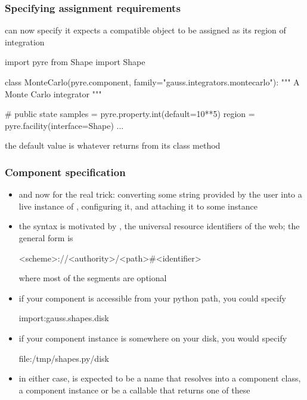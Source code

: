 \begin{frame}[fragile]
%
  \frametitle{Specifying assignment requirements}
%
   can now specify it expects a  compatible object to be
  assigned as its region of integration
%
  \begin{ipython}{}
import pyre
from Shape import Shape

class MonteCarlo(pyre.component, family="gauss.integrators.montecarlo"):
    """
    A Monte Carlo integrator
    """

    # public state
    samples = pyre.property.int(default=10**5)
    region = pyre.facility(interface=Shape)
    ...
  \end{ipython}
%
  the default value is whatever  returns from its  class
  method
%
\end{frame}

\begin{frame}[fragile]
%
  \frametitle{Component specification}
%
  \begin{itemize}
%
  \item and now for the real trick: converting some string provided by the user into a live
    instance of , configuring it, and attaching it to some
     instance
%
  \item the syntax is motivated by , the universal resource identifiers of the
    web; the general form is
    \begin{icfg}{}
      <scheme>://<authority>/<path>#<identifier>
    \end{icfg}
    where most of the segments are optional
%
  \item if your component is accessible from your python path, you could specify
    \begin{icfg}{}
      import:gauss.shapes.disk
    \end{icfg}
%
  \item if your component instance is somewhere on your disk, you would specify
    \begin{icfg}{}
      file:/tmp/shapes.py/disk
    \end{icfg}
%
  \item in either case,  is expected to be a name that resolves into a component
    class, a component instance or be a callable that returns one of these
%
  \end{itemize}
%
\end{frame}

